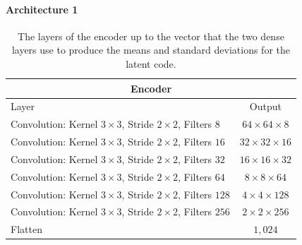 \paragraph{Architecture 1}

\begin{center}
    \begin{table}[H]
        \centering
        \begin{tabular}{ | l | c | }
            \multicolumn{2}{c}{Encoder} \\ \hline
            Layer & Output\\ \hline
            Convolution: Kernel $3\times3$, Stride $2\times2$, Filters $8  $    & $64\times 64\times 8  $    \\  
            Convolution: Kernel $3\times3$, Stride $2\times2$, Filters $16 $    & $32\times 32\times 16 $    \\
            Convolution: Kernel $3\times3$, Stride $2\times2$, Filters $32 $    & $16\times 16\times 32 $    \\
            Convolution: Kernel $3\times3$, Stride $2\times2$, Filters $64 $    & $8\times 8\times   64 $    \\
            Convolution: Kernel $3\times3$, Stride $2\times2$, Filters $128$    & $4\times 4\times   128$    \\
            Convolution: Kernel $3\times3$, Stride $2\times2$, Filters $256$    & $2\times 2\times   256$    \\
            Flatten                                                             & $1,024$                    \\
            \hline
        \end{tabular} 
        \caption{The layers of the encoder up to the vector that the two dense layers use to produce 
        the means and standard deviations for the latent code.}
    \end{table}
\end{center}
\vspace{-4em}
